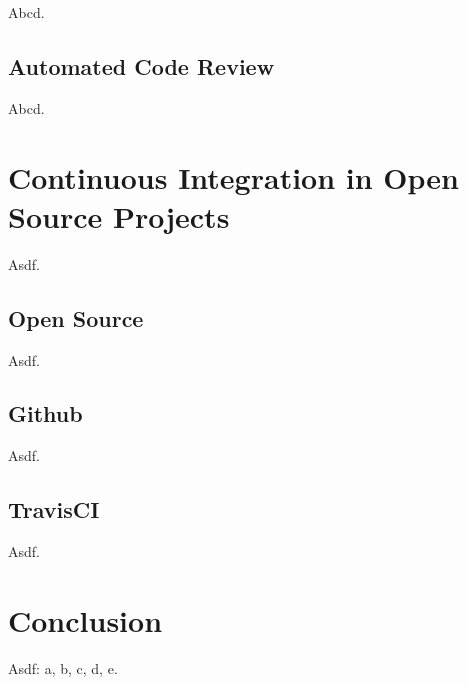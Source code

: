 Abcd.

\section{Automated Code Review}

Abcd.

\chapter{Continuous Integration in Open Source Projects}

Asdf.

\section{Open Source}

Asdf.

\section{Github}

Asdf.

\section{TravisCI}

Asdf.

\chapter{Conclusion}

Asdf: a\cite{MIQBOT}, b\cite{GHMP}, c\cite{CIMF}, d\cite{CITW}, e\cite{CIPD}.
